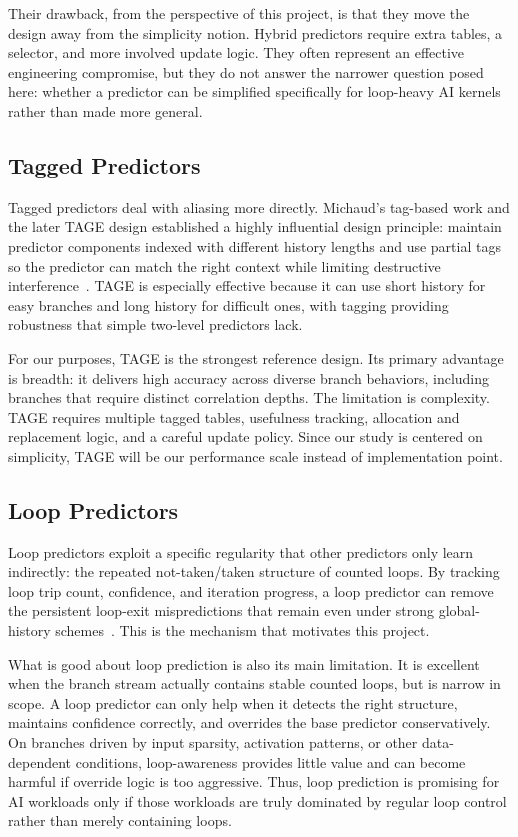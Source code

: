 \documentclass[conference]{IEEEtran}
\begin{document}
Their drawback, from the perspective of this project, is that they move the design away from the simplicity notion. Hybrid predictors require extra tables, a selector, and more involved update logic. They often represent an effective engineering compromise, but they do not answer the narrower question posed here: whether a predictor can be simplified specifically for loop-heavy AI kernels rather than made more general.

\subsection{Tagged Predictors}
Tagged predictors deal with aliasing more directly. Michaud's tag-based work and the later TAGE design established a highly influential design principle: maintain predictor components indexed with different history lengths and use partial tags so the predictor can match the right context while limiting destructive interference~\cite{michaud_2005,seznec_michaud_2006}. TAGE is especially effective because it can use short history for easy branches and long history for difficult ones, with tagging providing robustness that simple two-level predictors lack.

For our purposes, TAGE is the strongest reference design. Its primary advantage is breadth: it delivers high accuracy across diverse branch behaviors, including branches that require distinct correlation depths. The limitation is complexity. TAGE requires multiple tagged tables, usefulness tracking, allocation and replacement logic, and a careful update policy. Since our study is centered on simplicity, TAGE will be our performance scale instead of implementation point.

\subsection{Loop Predictors}
Loop predictors exploit a specific regularity that other predictors only learn indirectly: the repeated not-taken/taken structure of counted loops. By tracking loop trip count, confidence, and iteration progress, a loop predictor can remove the persistent loop-exit mispredictions that remain even under strong global-history schemes~\cite{seznec_2016}. This is the mechanism that motivates this project.

What is good about loop prediction is also its main limitation. It is excellent when the branch stream actually contains stable counted loops, but is narrow in scope. A loop predictor can only help when it detects the right structure, maintains confidence correctly, and overrides the base predictor conservatively. On branches driven by input sparsity, activation patterns, or other data-dependent conditions, loop-awareness provides little value and can become harmful if override logic is too aggressive. Thus, loop prediction is promising for AI workloads only if those workloads are truly dominated by regular loop control rather than merely containing loops.
\end{document}
